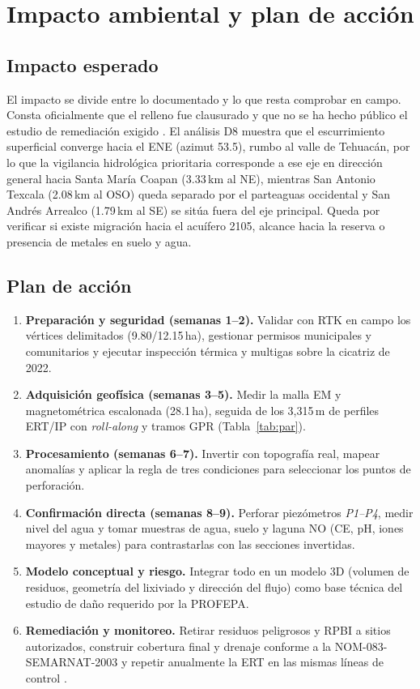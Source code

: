 \section{Impacto ambiental y plan de acción}
\subsection{Impacto esperado}
El impacto se divide entre lo documentado y lo que resta comprobar en campo. Consta oficialmente que el relleno fue clausurado y que no se ha hecho público el estudio de remediación exigido \cite{greenpeace,profepa}. El análisis D8 muestra que el escurrimiento superficial converge hacia el ENE (azimut 53.5\textdegree), rumbo al valle de Tehuacán, por lo que la vigilancia hidrológica prioritaria corresponde a ese eje en dirección general hacia Santa María Coapan (3.33\,km al NE), mientras San Antonio Texcala (2.08\,km al OSO) queda separado por el parteaguas occidental y San Andrés Arrealco (1.79\,km al SE) se sitúa fuera del eje principal. Queda por verificar si existe migración hacia el acuífero 2105, alcance hacia la reserva o presencia de metales en suelo y agua.

\subsection{Plan de acción}
\begin{enumerate}
\item \textbf{Preparación y seguridad (semanas 1--2).} Validar con RTK en campo los vértices delimitados (9.80/12.15\,ha), gestionar permisos municipales y comunitarios y ejecutar inspección térmica y multigas sobre la cicatriz de 2022.
\item \textbf{Adquisición geofísica (semanas 3--5).} Medir la malla EM y magnetométrica escalonada (28.1\,ha), seguida de los 3,315\,m de perfiles ERT/IP con \emph{roll-along} y tramos GPR (Tabla~\ref{tab:par}).
\item \textbf{Procesamiento (semanas 6--7).} Invertir con topografía real, mapear anomalías y aplicar la regla de tres condiciones para seleccionar los puntos de perforación.
\item \textbf{Confirmación directa (semanas 8--9).} Perforar piezómetros \emph{P1--P4}, medir nivel del agua y tomar muestras de agua, suelo y laguna NO (CE, pH, iones mayores y metales) para contrastarlas con las secciones invertidas.
\item \textbf{Modelo conceptual y riesgo.} Integrar todo en un modelo 3D (volumen de residuos, geometría del lixiviado y dirección del flujo) como base técnica del estudio de daño requerido por la PROFEPA.
\item \textbf{Remediación y monitoreo.} Retirar residuos peligrosos y RPBI a sitios autorizados, construir cobertura final y drenaje conforme a la NOM-083-SEMARNAT-2003 \cite{nom083} y repetir anualmente la ERT en las mismas líneas de control \cite{helene2020}.
\end{enumerate}

